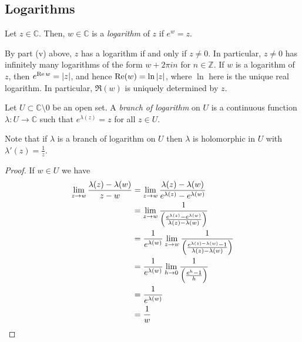 \subsection{Logarithms}
\begin{definition}
	Let \( z \in \mathbb C \).
	Then, \( w \in \mathbb C \) is a \textit{logarithm} of \( z \) if \( e^w = z \).
\end{definition}
By part (v) above, \( z \) has a logarithm if and only if \( z \neq 0 \).
In particular, \( z \neq 0 \) has infinitely many logarithms of the form \( w + 2 \pi i n \) for \( n \in \mathbb Z \).
If \( w \) is a logarithm of \( z \), then \( e^{\Re w} = \abs{z} \), and hence \( \Re(w) = \ln \abs{z} \), where \( \ln \) here is the unique real logarithm.
In particular, \( \Re(w) \) is uniquely determined by \( z \).
\begin{definition}
	Let \( U \subset \mathbb C \setminus \qty{0} \) be an open set.
	A \textit{branch of logarithm} on \( U \) is a continuous function \( \lambda \colon U \to \mathbb C \) such that \( e^{\lambda(z)} = z \) for all \( z \in U \).
\end{definition}
\begin{remark}
	Note that if \( \lambda \) is a branch of logarithm on \( U \) then \( \lambda \) is holomorphic in \( U \) with \( \lambda'(z) = \frac{1}{z} \).
\end{remark}
\begin{proof}
	If \( w \in U \) we have
	\begin{align*}
		\lim_{z \to w} \frac{\lambda(z) - \lambda(w)}{z - w} & = \lim_{z \to w} \frac{\lambda(z) - \lambda(w)}{e^{\lambda(z)} - e^{\lambda(w)}}                                          \\
		                                                     & = \lim_{z \to w} \frac{1}{\qty(\frac{e^{\lambda(z)} - e^{\lambda(w)}}{\lambda(z) - \lambda(w)})}                          \\
		                                                     & = \frac{1}{e^{\lambda(w)}} \lim_{z \to w} \frac{1}{\qty(\frac{e^{\lambda(z) - \lambda(w)} - 1}{\lambda(z) - \lambda(w)})} \\
		                                                     & = \frac{1}{e^{\lambda(w)}} \lim_{h \to 0} \frac{1}{\qty(\frac{e^h - 1}{h})}                                               \\
		                                                     & = \frac{1}{e^{\lambda(w)}}                                                                                                \\
		                                                     & = \frac{1}{w}
	\end{align*}
\end{proof}
